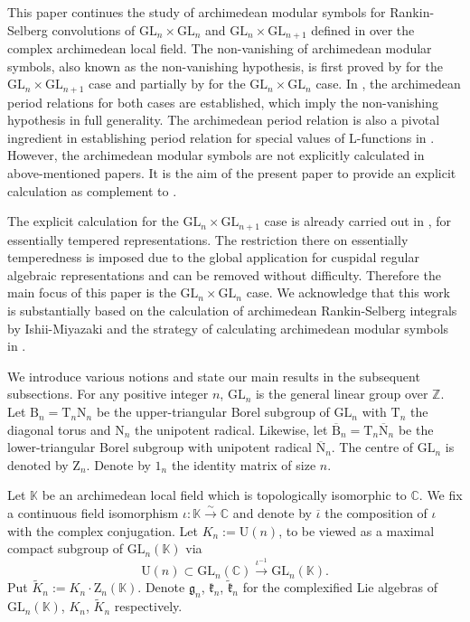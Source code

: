 \documentclass[12pt, a4paper]{amsart}
\newcommand{\RB}{{\mathrm {B}}}
\newcommand{\RN}{{\mathrm {N}}}
\newcommand{\RT}{{\mathrm {T}}}
\newcommand{\RU}{{\mathrm {U}}}
\newcommand{\RZ}{{\mathrm {Z}}}
\newcommand{\GL}{{\mathrm{GL}}}
\newcommand{\Z}{\mathbb{Z}}
\newcommand{\C}{\mathbb{C}}
\newcommand{\K}{\mathbb{K}}
\theoremstyle{Theorem}
\theoremstyle{Theorem}
\theoremstyle{Theorem}
\theoremstyle{Theorem}
\theoremstyle{Plain}
\theoremstyle{Definition}
\begin{document}
	This paper continues the study of archimedean modular symbols for Rankin-Selberg convolutions of $\GL_n\times\GL_n$ and $\GL_n\times\GL_{n+1}$ defined in \cite{JLSa, LLS24} over the complex archimedean local field. The non-vanishing of archimedean modular symbols, also known as the non-vanishing hypothesis, is first proved by \cite{Sun} for the $\GL_n\times\GL_{n+1}$ case and partially by \cite{DX} for the $\GL_n\times\GL_n$ case. In \cite{JLSa, LLS24}, the archimedean period relations for both cases are established, which imply the non-vanishing hypothesis in full generality. The archimedean period relation is also a pivotal ingredient in establishing period relation for special values of L-functions in \cite{JLSa, LLS24}. However, the archimedean modular symbols are not explicitly calculated in above-mentioned papers. It is the aim of the present paper to provide an explicit calculation as complement to \cite{JLSa, LLS24}.
	
	The explicit calculation for the $\GL_n\times\GL_{n+1}$ case is already carried out in \cite{HMN}, for essentially tempered representations. The restriction there on essentially temperedness is imposed due to the global application for cuspidal regular algebraic representations and can be removed without difficulty. Therefore the main focus of this paper is the $\GL_n\times\GL_n$ case. We acknowledge that this work is substantially based on the calculation of archimedean Rankin-Selberg integrals by Ishii-Miyazaki \cite{IM} and the strategy of calculating archimedean modular symbols in \cite{HMN}.
	
	We introduce various notions and state our main results in the subsequent subsections. For any positive integer $n$, $\GL_n$ is the general linear group over $\Z$. Let $\RB_n=\RT_n\RN_n$ be the upper-triangular Borel subgroup of $\GL_n$ with $\RT_n$ the diagonal torus and $\RN_n$ the unipotent radical. Likewise, let $\overline{\RB}_n=\RT_n\overline{\RN}_n$ be the lower-triangular Borel subgroup with unipotent radical $\overline{\RN}_n$. The centre of $\GL_n$ is denoted by $\RZ_n$. Denote by $1_n$ the identity matrix of size $n$.
	
	Let $\K$ be an archimedean local field which is topologically isomorphic to $\C$. We fix a continuous field isomorphism $\iota:\K\xrightarrow{\sim}\C$ and denote by $\overline{\iota}$ the composition of $\iota$ with the complex conjugation. Let $K_n:=\RU(n)$, to be viewed as a maximal compact subgroup of $\GL_n(\K)$ via
	\[
	\RU(n)\subset\GL_n(\C)\xrightarrow{\iota^{-1}}\GL_n(\K).
	\] 
	Put $\widetilde{K}_n:=K_n\cdot\RZ_n(\K)$. Denote $\mathfrak{g}_n$, $\mathfrak{k}_n$, $\widetilde{\mathfrak{k}}_n$ for the complexified Lie algebras of $\GL_n(\K)$, $K_n$, $\widetilde{K}_n$ respectively.
	
\end{document}
